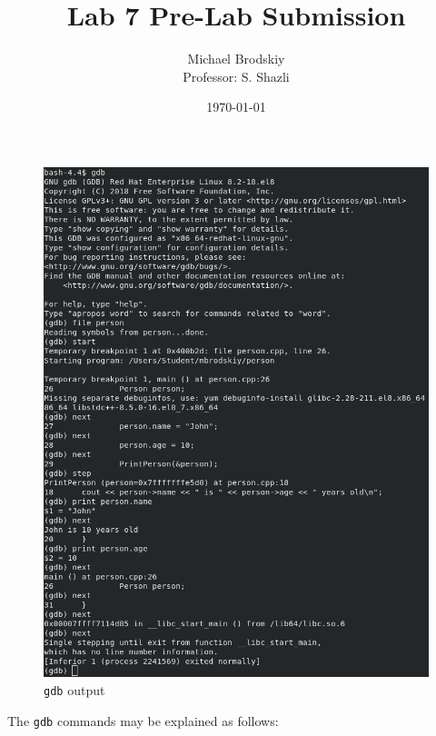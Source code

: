 


\title{Lab 7 Pre-Lab Submission}
\date{\today}
\author{Michael Brodskiy\\ \small Professor: S. Shazli}



\maketitle

\begin{figure}[H]
  \centering
  \includegraphics[width=.7\textwidth]{Figures/gdb.png}
  \caption{\texttt{gdb} output}
  \label{fig:1}
\end{figure}

The \texttt{gdb} commands may be explained as follows:

